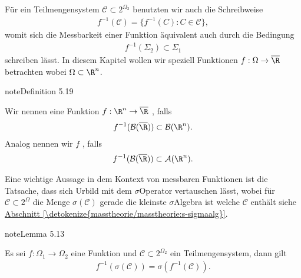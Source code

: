 \documentclass[letterpaper,10pt,german]{jupyterBook}
\begin{document}
\sphinxAtStartPar
Für ein Teilmengensystem \(\mathcal{C}\subset 2^{\Omega_2}\) benutzten wir auch die Schreibweise
\begin{equation*}
\begin{split}f^{-1}(\mathcal{C}) = \{ f^{-1}(C): C\in\mathcal{C}\},\end{split}
\end{equation*}
\sphinxAtStartPar
womit sich die Messbarkeit einer Funktion äquivalent auch durch die Bedingung
\begin{equation*}
\begin{split}f^{-1}(\Sigma_2)\subset\Sigma_1\end{split}
\end{equation*}
\sphinxAtStartPar
schreiben lässt. In diesem Kapitel wollen wir speziell Funktionen \(f:\Omega\to\overline{\R}\) betrachten wobei \(\Omega\subset\R^n\).
\label{masstheorie/lebesgue_integral:definition-1}
\begin{sphinxadmonition}{note}{Definition 5.19}



\sphinxAtStartPar
Wir nennen eine Funktion \(f:\R^n\to\overline{\R}\) , falls
\begin{equation*}
\begin{split}f^{-1}(\mathcal{B}(\overline{\R}))\subset \mathcal{B}(\R^n).\end{split}
\end{equation*}
\sphinxAtStartPar
Analog nennen wir \(f\) , falls
\begin{equation*}
\begin{split}f^{-1}(\mathcal{B}(\overline{\R}))\subset \mathcal{A}(\R^n).\end{split}
\end{equation*}\end{sphinxadmonition}

\sphinxAtStartPar
Eine wichtige Aussage in dem Kontext von messbaren Funktionen ist die Tatsache, dass sich Urbild mit dem \(\sigma\)\sphinxhyphen{}Operator vertauschen lässt, wobei für \(\mathcal{C}\subset 2^\Omega\) die Menge \(\sigma(\mathcal{C})\) gerade die kleinste \(\sigma\)\sphinxhyphen{}Algebra ist welche \(\mathcal{C}\) enthält siehe \hyperref[\detokenize{masstheorie/masstheorie:s-sigmaalg}]{Abschnitt \ref{\detokenize{masstheorie/masstheorie:s-sigmaalg}}}.
\label{masstheorie/lebesgue_integral:lem:changesigma}
\begin{sphinxadmonition}{note}{Lemma 5.13}



\sphinxAtStartPar
Es sei \(f:\Omega_1\to\Omega_2\) eine Funktion und \(\mathcal{C}\subset 2^{\Omega_2}\) ein Teilmengensystem, dann gilt
\begin{equation*}
\begin{split}f^{-1}(\sigma(\mathcal{C})) = \sigma(f^{-1}(\mathcal{C})).\end{split}
\end{equation*}\end{sphinxadmonition}
\end{document}
